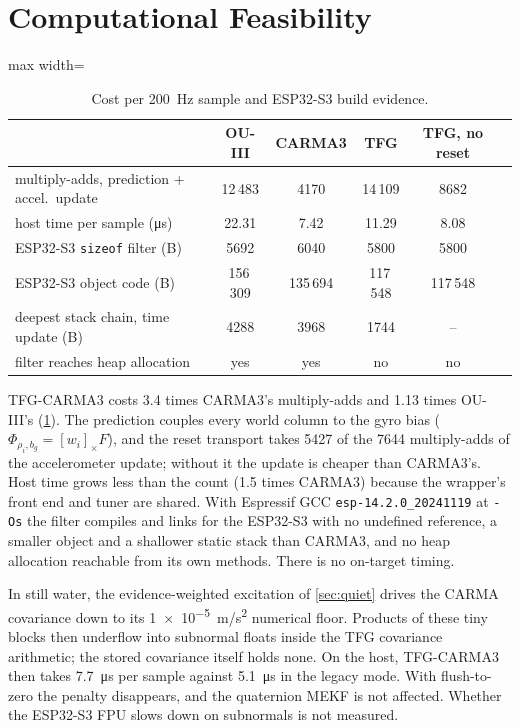 \documentclass[conference]{IEEEtran}
\newcommand{\Skew}[1]{\left[#1\right]_\times}
\theoremstyle{bodysmall}
\begin{document}
\section{Computational Feasibility}
\label{sec:cost}
\begin{table}[t]
  \centering
  \caption{Cost per \SI{200}{Hz} sample and ESP32-S3 build evidence.}
  \label{tab:cost}
  \footnotesize
  \setlength{\tabcolsep}{2.5pt}
  \begin{adjustbox}{max width=\columnwidth}
  \begin{tabular}{@{}lccccc@{}}
    \toprule
    & OU-III & CARMA3 & TFG & TFG, no reset\\
    \midrule
    multiply-adds, prediction + accel.\ update & 12\,483 & 4170 & 14\,109 & 8682\\
    host time per sample (\si{\micro s}) & 22.31 & 7.42 & 11.29 & 8.08\\
    ESP32-S3 \texttt{sizeof} filter (B) & 5692 & 6040 & 5800 & 5800\\
    ESP32-S3 object code (B) & 156\,309 & 135\,694 & 117\,548 & 117\,548\\
    deepest stack chain, time update (B) & 4288 & 3968 & 1744 & --\\
    filter reaches heap allocation & yes & yes & no & no\\
    \bottomrule
  \end{tabular}
  \end{adjustbox}
\end{table}

TFG-CARMA3 costs 3.4 times CARMA3's multiply-adds and 1.13 times OU-III's
(\cref{tab:cost}). The prediction couples every world column to the gyro bias
($\Phi_{\rho_i,b_g}=\Skew{w_i}F$), and the reset transport takes 5427 of the
7644 multiply-adds of the accelerometer update; without it the update is
cheaper than CARMA3's. Host time grows less than the count (1.5 times CARMA3)
because the wrapper's front end and tuner are shared. With Espressif GCC
\texttt{esp-14.2.0\_20241119} at \texttt{-Os} the filter compiles and links
for the ESP32-S3 with no undefined reference, a smaller object and a shallower
static stack than CARMA3, and no heap allocation reachable from its own
methods. There is no on-target timing.

In still water, the evidence-weighted excitation of \cref{sec:quiet} drives
the CARMA covariance down to its \SI{1e-5}{m/s^2} numerical floor. Products
of these tiny blocks then underflow into subnormal floats inside the TFG
covariance arithmetic; the stored covariance itself holds none. On the host,
TFG-CARMA3 then takes \SI{7.7}{\micro s} per sample against \SI{5.1}{\micro s}
in the legacy mode. With flush-to-zero the penalty disappears, and the
quaternion MEKF is not affected. Whether the ESP32-S3 FPU slows down on
subnormals is not measured.
\end{document}
